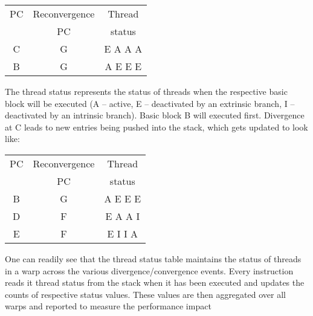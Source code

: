 \begin{center}
\begin{tabular}{|c|c|c|}
		\hline
		PC	& Reconvergence	&	Thread	\\	
		  	&	PC	&	status	\\
		\hline
		C	&		G&		E A A A \\
		B	&		G&		A E E E \\
		\hline
\end{tabular}
\end{center}

The thread status represents the status of threads when the respective basic block will be executed (A -- active, E -- deactivated by an extrinsic branch, I -- deactivated by an intrinsic branch). Basic block B will  executed first. Divergence at C leads to new entries being pushed into the stack, which gets updated to look like:

\begin{center}
\begin{tabular}{|c|c|c|}
		\hline
		PC	& Reconvergence	&	Thread	\\	
		  	&	PC	&	status	\\
		\hline
		B	&		G&		A E E E \\
		D	&		F&		E A A I \\
		E	&		F&		E I I A \\
		\hline
\end{tabular}
\end{center}

\par{One can readily see that the thread status table maintains the status of threads in a warp across the various divergence/convergence events. Every instruction reads it thread status from the stack when it has been executed and updates the counts of respective status values. These values are then aggregated over all warps and reported to measure the performance impact}
